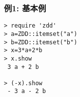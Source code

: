 \subsubsection*{例1: 基本例}



\begin{Verbatim}[baselinestretch=0.7,frame=single]
> require 'zdd'
> a=ZDD::itemset("a")
> b=ZDD::itemset("b")
> x=3*a+2*b
> x.show
 3 a + 2 b

> (-x).show
 - 3 a - 2 b
\end{Verbatim}
